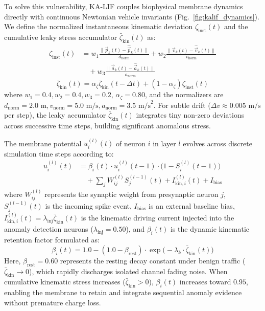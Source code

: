 \documentclass[journal]{IEEEtran}
\begin{document}
To solve this vulnerability, KA-LIF couples biophysical membrane dynamics directly with continuous Newtonian vehicle invariants (Fig.~\ref{fig:kalif_dynamics}). We define the normalized instantaneous kinematic deviation $\zeta_{\text{inst}}(t)$ and the cumulative leaky stress accumulator $\bar{\zeta}_{\text{kin}}(t)$ as:
\begin{equation}
\begin{split}
    \zeta_{\text{inst}}(t) &= w_1 \frac{\|\vec{p}_k(t) - \hat{\vec{p}}_k(t)\|}{d_{\text{norm}}} + w_2 \frac{\|\vec{v}_k(t) - \hat{\vec{v}}_k(t)\|}{v_{\text{norm}}} \\
    &\quad + w_3 \frac{\|\vec{a}_k(t) - \hat{\vec{a}}_k(t)\|}{a_{\text{norm}}}
\end{split}
\end{equation}
\begin{equation}
    \bar{\zeta}_{\text{kin}}(t) = \alpha_{\zeta} \bar{\zeta}_{\text{kin}}(t - \Delta t) + (1 - \alpha_{\zeta}) \zeta_{\text{inst}}(t)
\end{equation}
where $w_1 = 0.4, w_2 = 0.4, w_3 = 0.2$, $\alpha_{\zeta} = 0.80$, and the normalizers are $d_{\text{norm}} = 2.0\text{ m}, v_{\text{norm}} = 5.0\text{ m/s}, a_{\text{norm}} = 3.5\text{ m/s}^2$. For subtle drift ($\Delta v \approx 0.005\text{ m/s}$ per step), the leaky accumulator $\bar{\zeta}_{\text{kin}}(t)$ integrates tiny non-zero deviations across successive time steps, building significant anomalous stress.

The membrane potential $u_i^{(l)}(t)$ of neuron $i$ in layer $l$ evolves across discrete simulation time steps according to:
\begin{equation}
\begin{split}
    u_i^{(l)}(t) &= \beta_i(t) \cdot u_i^{(l)}(t - 1) \cdot \big(1 - S_i^{(l)}(t - 1)\big) \\
    &\quad + \sum_{j} W_{ij}^{(l)} S_j^{(l-1)}(t) + I_{\text{kin}, i}^{(l)}(t) + I_{\text{bias}}
\end{split}
\end{equation}
where $W_{ij}^{(l)}$ represents the synaptic weight from presynaptic neuron $j$, $S_j^{(l-1)}(t)$ is the incoming spike event, $I_{\text{bias}}$ is an external baseline bias, $I_{\text{kin}, i}^{(l)}(t) = \lambda_{\text{inj}} \bar{\zeta}_{\text{kin}}(t)$ is the kinematic driving current injected into the anomaly detection neurons ($\lambda_{\text{inj}} = 0.50$), and $\beta_i(t)$ is the dynamic kinematic retention factor formulated as:
\begin{equation}
    \beta_i(t) = 1.0 - (1.0 - \beta_{\text{rest}}) \cdot \exp\big( -\lambda_k \cdot \bar{\zeta}_{\text{kin}}(t) \big)
\end{equation}
Here, $\beta_{\text{rest}} = 0.60$ represents the resting decay constant under benign traffic ($\bar{\zeta}_{\text{kin}} \to 0$), which rapidly discharges isolated channel fading noise. When cumulative kinematic stress increases ($\bar{\zeta}_{\text{kin}} > 0$), $\beta_i(t)$ increases toward $0.95$, enabling the membrane to retain and integrate sequential anomaly evidence without premature charge loss.
\end{document}
